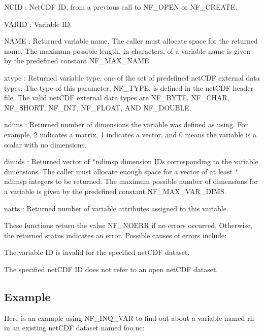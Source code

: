 {\ttfamily N\+C\+ID} \+: Net\+C\+DF ID, from a previous call to N\+F\+\_\+\+O\+P\+EN or N\+F\+\_\+\+C\+R\+E\+A\+TE.

{\ttfamily V\+A\+R\+ID} \+: Variable ID.

{\ttfamily N\+A\+ME} \+: Returned variable name. The caller must allocate space for the returned name. The maximum possible length, in characters, of a variable name is given by the predefined constant N\+F\+\_\+\+M\+A\+X\+\_\+\+N\+A\+ME.

{\ttfamily xtype} \+: Returned variable type, one of the set of predefined net\+C\+DF external data types. The type of this parameter, N\+F\+\_\+\+T\+Y\+PE, is defined in the net\+C\+DF header file. The valid net\+C\+DF external data types are N\+F\+\_\+\+B\+Y\+TE, N\+F\+\_\+\+C\+H\+AR, N\+F\+\_\+\+S\+H\+O\+RT, N\+F\+\_\+\+I\+NT, N\+F\+\_\+\+F\+L\+O\+AT, A\+ND N\+F\+\_\+\+D\+O\+U\+B\+LE.

{\ttfamily ndims} \+: Returned number of dimensions the variable was defined as using. For example, 2 indicates a matrix, 1 indicates a vector, and 0 means the variable is a scalar with no dimensions.

{\ttfamily dimids} \+: Returned vector of $\ast$ndimsp dimension I\+Ds corresponding to the variable dimensions. The caller must allocate enough space for a vector of at least $\ast$ndimsp integers to be returned. The maximum possible number of dimensions for a variable is given by the predefined constant N\+F\+\_\+\+M\+A\+X\+\_\+\+V\+A\+R\+\_\+\+D\+I\+MS.

{\ttfamily natts} \+: Returned number of variable attributes assigned to this variable.

These functions return the value N\+F\+\_\+\+N\+O\+E\+RR if no errors occurred. Otherwise, the returned status indicates an error. Possible causes of errors include\+:


\begin{DoxyItemize}
\item The variable ID is invalid for the specified net\+C\+DF dataset.
\item The specified net\+C\+DF ID does not refer to an open net\+C\+DF dataset.
\end{DoxyItemize}

\subsection*{Example }

Here is an example using N\+F\+\_\+\+I\+N\+Q\+\_\+\+V\+AR to find out about a variable named rh in an existing net\+C\+DF dataset named foo.\+nc\+:

